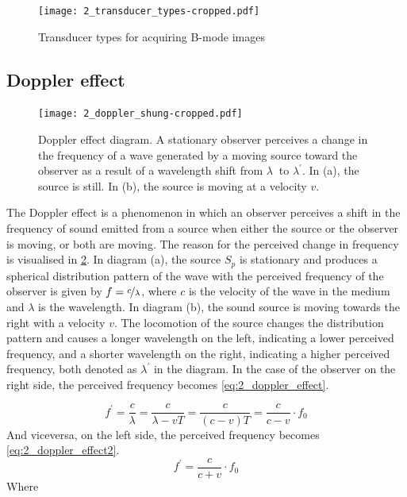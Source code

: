 \begin{figure}[ht]
	\centering
	\texttt{[image: 2\_transducer\_types-cropped.pdf]}
	\caption[Transducer types for acquiring B-mode images]{Transducer types for acquiring B-mode images \cite{JensenUltrasoundBook}}
	\label{fig:2_transducer_types}
\end{figure}

\subsection{Doppler effect} \label{sec:doppler_effect}

\begin{figure}[ht]
	\centering
	\texttt{[image: 2\_doppler\_shung-cropped.pdf]}
	\caption[Doppler effect diagram]{Doppler effect diagram. A stationary observer perceives a change in the frequency of a wave generated by a moving source toward the observer as a result of a wavelength shift from $\lambda\ $ to $\lambda^{\prime}$. In (a), the source is still. In (b), the source is moving at a velocity $v$. \cite{ShungUltrasound_Book}}
	\label{fig:2_doppler_effect}
\end{figure}

The Doppler effect is a phenomenon in which an observer perceives a shift in the frequency of sound emitted from a source when either the source or the observer is moving, or both are moving. The reason for the perceived change in frequency is visualised in \cref{fig:2_doppler_effect}. In diagram (a), the source $S_{p}$ is stationary and produces a spherical distribution pattern of the wave with the perceived frequency of the observer is given by $f=\nicefrac{c}{\lambda}$, where $c$ is the velocity of the wave in the medium and $\lambda$ is the wavelength. In diagram (b), the sound source is moving towards the right with a velocity $v$. The locomotion of the source changes the distribution pattern and causes a longer wavelength on the left, indicating a lower perceived frequency, and a shorter wavelength on the right, indicating a higher perceived frequency, both denoted as $\lambda^{\prime}$ in the diagram. In the case of the observer on the right side, the perceived frequency becomes \cref{eq:2_doppler_effect}.

\begin{equation} \label{eq:2_doppler_effect}
	f^{\prime} = \frac{c}{\lambda} = \frac{c}{\lambda - v T} = \frac{c}{(c-v)T} = \frac{c}{c-v}\cdot f_{0}
\end{equation}
And viceversa, on the left side, the perceived frequency becomes \cref{eq:2_doppler_effect2}.
\begin{equation} \label{eq:2_doppler_effect2}
	f^{\prime} = \frac{c}{c+v} \cdot f_{0}
\end{equation}
Where 

